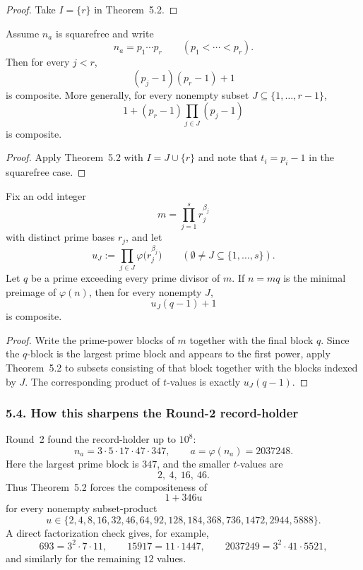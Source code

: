 \begin{proof}
Take $I=\{r\}$ in Theorem~5.2.
\end{proof}

\begin{corollary}
Assume $n_a$ is squarefree and write
\[
 n_a=p_1\cdots p_r
\qquad (p_1<\cdots <p_r).
\]
Then for every $j<r$,
\[
 (p_j-1)(p_r-1)+1
\]
is composite.
More generally, for every nonempty subset $J\subseteq\{1,\dots,r-1\}$,
\[
 1+(p_r-1)\prod_{j\in J}(p_j-1)
\]
is composite.
\end{corollary}

\begin{proof}
Apply Theorem~5.2 with $I=J\cup\{r\}$ and note that $t_i=p_i-1$ in the squarefree case.
\end{proof}

\begin{corollary}
Fix an odd integer
\[
 m=\prod_{j=1}^s r_j^{\beta_j}
\]
with distinct prime bases $r_j$, and let
\[
 u_J:=\prod_{j\in J}\varphi\!\bigl(r_j^{\beta_j}\bigr)
\qquad (\emptyset\neq J\subseteq\{1,\dots,s\}).
\]
Let $q$ be a prime exceeding every prime divisor of $m$.
If $n=mq$ is the minimal preimage of $\varphi(n)$, then for every nonempty $J$,
\[
 u_J(q-1)+1
\]
is composite.
\end{corollary}

\begin{proof}
Write the prime-power blocks of $m$ together with the final block $q$.
Since the $q$-block is the largest prime block and appears to the first power, apply Theorem~5.2 to subsets consisting of that block together with the blocks indexed by $J$.
The corresponding product of $t$-values is exactly $u_J(q-1)$.
\end{proof}

\subsubsection*{5.4. How this sharpens the Round-2 record-holder}
Round~2 found the record-holder up to $10^8$:
\[
 n_a=3\cdot 5\cdot 17\cdot 47\cdot 347,
\qquad
 a=\varphi(n_a)=2037248.
\]
Here the largest prime block is $347$, and the smaller $t$-values are
\[
 2,\ 4,\ 16,\ 46.
\]
Thus Theorem~5.2 forces the compositeness of
\[
 1+346u
\]
for every nonempty subset-product
\[
 u\in\{2,4,8,16,32,46,64,92,128,184,368,736,1472,2944,5888\}.
\]
A direct factorization check gives, for example,
\[
 693=3^2\cdot 7\cdot 11,
\qquad
 15917=11\cdot 1447,
\qquad
 2037249=3^2\cdot 41\cdot 5521,
\]
and similarly for the remaining $12$ values.

